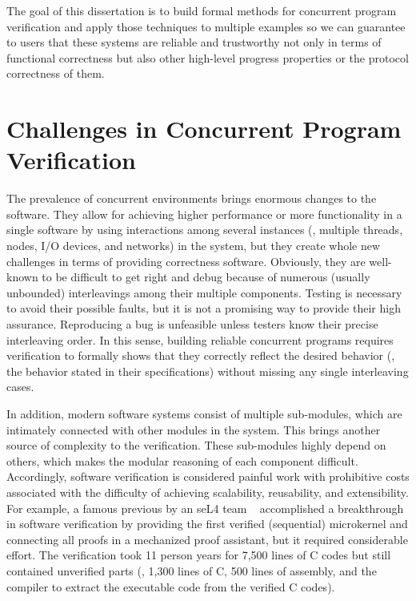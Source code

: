 The goal of this dissertation is to build formal methods for concurrent program verification and apply those techniques to 
multiple examples so we can guarantee to users that these systems are reliable and trustworthy not only in terms of functional correctness 
but also other high-level progress properties or the protocol correctness of them.


\section{Challenges in Concurrent Program Verification}
\label{chapter:introduction:sec:challenges-in-concurrent-program-verification}




The prevalence of concurrent environments brings enormous changes to the software. 
They allow for achieving higher performance or more functionality in a single software by using interactions among several instances 
(\ie, multiple threads, nodes, I/O devices, and networks) in the system, 
but they create whole new challenges in terms of providing correctness software. 
Obviously, they are well-known to be difficult to get right and debug because of numerous (usually unbounded)
 interleavings among their multiple components. Testing is necessary to avoid their possible faults, 
 but it is not a promising way to provide their high assurance. Reproducing a bug is unfeasible unless testers know their precise interleaving order.
In this sense, building reliable concurrent programs requires verification to formally shows that they 
correctly reflect the desired behavior (\ie, the behavior stated in their specifications) without missing any single interleaving cases.


In addition, modern software systems consist of multiple sub-modules, 
which are intimately connected with other modules in the system. This brings another source of complexity to the verification. 
These sub-modules highly depend on others, which makes the modular reasoning of each component difficult. 
Accordingly, software verification is considered painful work with prohibitive costs associated with the difficulty of achieving scalability, 
reusability,  and extensibility. 
For example, a famous previous by an seL4 team ~\cite{klein2009sel4} accomplished a breakthrough in software verification 
by providing the first verified (sequential) microkernel and connecting all proofs in a mechanized proof assistant, 
but it required considerable effort. The verification took 11 person years for 7,500 lines of C codes but still contained unverified parts
 (\ie, 1,300 lines of C, 500 lines of assembly, and the compiler to extract the executable code from the verified C codes).



